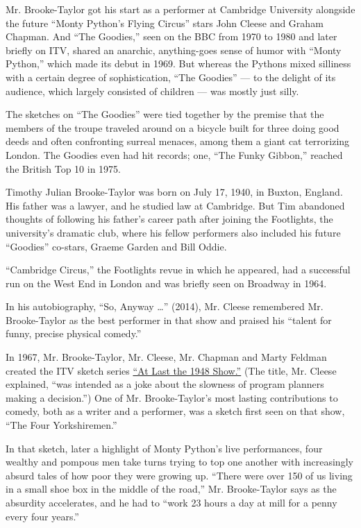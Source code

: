 Mr. Brooke-Taylor got his start as a performer at Cambridge University
alongside the future ``Monty Python's Flying Circus'' stars John Cleese
and Graham Chapman. And ``The Goodies,'' seen on the BBC from 1970 to
1980 and later briefly on ITV, shared an anarchic, anything-goes sense
of humor with ``Monty Python,'' which made its debut in 1969. But
whereas the Pythons mixed silliness with a certain degree of
sophistication, ``The Goodies'' --- to the delight of its audience,
which largely consisted of children --- was mostly just silly.

The sketches on ``The Goodies'' were tied together by the premise that
the members of the troupe traveled around on a bicycle built for three
doing good deeds and often confronting surreal menaces, among them a
giant cat terrorizing London. The Goodies even had hit records; one,
``The Funky Gibbon,'' reached the British Top 10 in 1975.

Timothy Julian Brooke-Taylor was born on July 17, 1940, in Buxton,
England. His father was a lawyer, and he studied law at Cambridge. But
Tim abandoned thoughts of following his father's career path after
joining the Footlights, the university's dramatic club, where his fellow
performers also included his future ``Goodies'' co-stars, Graeme Garden
and Bill Oddie.

``Cambridge Circus,'' the Footlights revue in which he appeared, had a
successful run on the West End in London and was briefly seen on
Broadway in 1964.

In his autobiography, ``So, Anyway \ldots{}'' (2014), Mr. Cleese
remembered Mr. Brooke-Taylor as the best performer in that show and
praised his ``talent for funny, precise physical comedy.''

In 1967, Mr. Brooke-Taylor, Mr. Cleese, Mr. Chapman and Marty Feldman
created the ITV sketch series
\href{https://www.youtube.com/watch?v=W6UrcD5MKs8}{``At Last the 1948
Show.''} (The title, Mr. Cleese explained, ``was intended as a joke
about the slowness of program planners making a decision.'') One of Mr.
Brooke-Taylor's most lasting contributions to comedy, both as a writer
and a performer, was a sketch first seen on that show, ``The Four
Yorkshiremen.''

In that sketch, later a highlight of Monty Python's live performances,
four wealthy and pompous men take turns trying to top one another with
increasingly absurd tales of how poor they were growing up. ``There were
over 150 of us living in a small shoe box in the middle of the road,''
Mr. Brooke-Taylor says as the absurdity accelerates, and he had to
``work 23 hours a day at mill for a penny every four years.''

